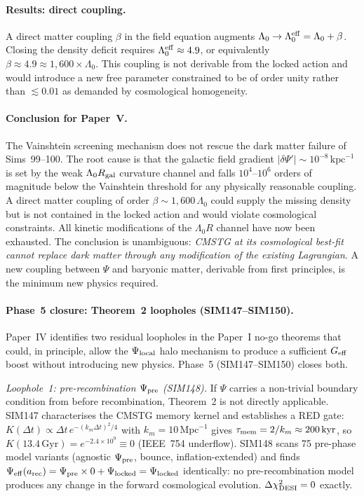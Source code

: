 \documentclass[12pt,a4paper]{article}
\begin{document}
\paragraph{Results: direct coupling.}
A direct matter coupling $\beta$ in the field equation augments
$\Lambda_0 \to \Lambda_0^{\rm eff} = \Lambda_0 + \beta$.  Closing the density
deficit requires $\Lambda_0^{\rm eff} \approx 4.9$, or equivalently
$\beta \approx 4.9 \approx 1{,}600 \times \Lambda_0$.  This coupling is not
derivable from the locked action and would introduce a new free parameter
constrained to be of order unity rather than $\lesssim 0.01$ as demanded by
cosmological homogeneity.

\paragraph{Conclusion for Paper~V.}
The Vainshtein screening mechanism does not rescue the dark matter failure of
Sims~99--100.  The root cause is that the galactic field gradient
$|\delta\Psi'| \sim 10^{-8}\,\mathrm{kpc}^{-1}$ is set by the weak
$\Lambda_0 R_{\rm gal}$ curvature channel and falls $10^{4}$--$10^{6}$ orders of
magnitude below the Vainshtein threshold for any physically reasonable coupling.
A direct matter coupling of order $\beta \sim 1{,}600\,\Lambda_0$ could supply the
missing density but is not contained in the locked action and would violate
cosmological constraints.  All kinetic modifications of the $\Lambda_0 R$ channel
have now been exhausted.  The conclusion is unambiguous: \emph{CMSTG at its
cosmological best-fit cannot replace dark matter through any modification of the
existing Lagrangian}.  A new coupling between $\Psi$ and baryonic matter,
derivable from first principles, is the minimum new physics required.

\paragraph{Phase~5 closure: Theorem~2 loopholes (SIM147--SIM150).}
Paper~IV identifies two residual loopholes in the Paper~I no-go theorems that
could, in principle, allow the $\Psi_{\rm local}$ halo mechanism to produce a
sufficient $G_{\rm eff}$ boost without introducing new physics.  Phase~5
(SIM147--SIM150) closes both.

\emph{Loophole~1: pre-recombination $\Psi_{\rm pre}$ (SIM148).}
If $\Psi$ carries a non-trivial boundary condition from before recombination,
Theorem~2 is not directly applicable.  SIM147 characterises the CMSTG memory
kernel and establishes a RED gate: $K(\Delta t) \propto
\Delta t\,e^{-(k_m\Delta t)^2/4}$ with $k_m=10\,\mathrm{Mpc}^{-1}$ gives
$\tau_{\rm mem}=2/k_m\approx200\,\mathrm{kyr}$, so $K(13.4\,\mathrm{Gyr})=
e^{-2.4\times10^9}\equiv0$ (IEEE~754 underflow).  SIM148 scans 75 pre-phase
model variants (agnostic $\Psi_{\rm pre}$, bounce, inflation-extended) and
finds $\Psi_{\rm eff}(a_{\rm rec})=\Psi_{\rm pre}\times0+\Psi_{\rm locked}=
\Psi_{\rm locked}$ identically: no pre-recombination model produces any change
in the forward cosmological evolution.  $\Delta\chi^2_{\rm DESI}=0$ exactly.
\end{document}
